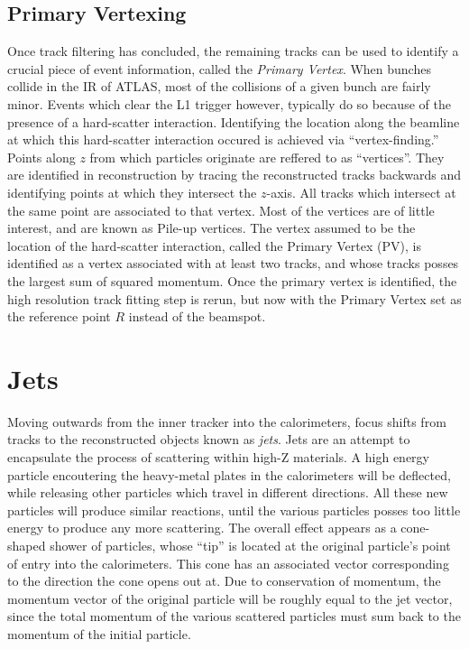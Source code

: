         \subsection{Primary Vertexing}

            Once track filtering has concluded,
                the remaining tracks can be used to identify a crucial piece of event information, 
                called the \textit{Primary Vertex}.
            When bunches collide in the IR of ATLAS, most of the collisions of a given bunch are fairly minor.
            Events which clear the L1 trigger however, typically do so because of the presence of a hard-scatter interaction. %
            Identifying the location along the beamline at which this hard-scatter interaction occured is achieved via ``vertex-finding.''
            Points along $z$ from which particles originate are reffered to as ``vertices''.
            They are identified in reconstruction by tracing the reconstructed tracks backwards
                and identifying points at which they intersect the $z$-axis.
            All tracks which intersect at the same point are associated to that vertex.
            Most of the vertices are of little interest, and are known as Pile-up vertices.
            The vertex assumed to be the location of the hard-scatter interaction, called the Primary Vertex (PV),
                is identified as a vertex associated with at least two tracks,
                and whose tracks posses the largest sum of squared momentum\cite{jet_energy_scale13TeV}.
            Once the primary vertex is identified, the high resolution track fitting step is rerun,
                but now with the Primary Vertex set as the reference point $R$ instead of the beamspot.


    \section{Jets}
        Moving outwards from the inner tracker into the calorimeters, focus shifts from tracks to the reconstructed objects known as \textit{jets}.
        Jets are an attempt to encapsulate the process of scattering within high-Z materials.
        A high energy particle encoutering the heavy-metal plates in the calorimeters will be deflected,
            while releasing other particles which travel in different directions.
        All these new particles will produce similar reactions, until the various particles posses too little energy to produce any more scattering.
        The overall effect appears as a cone-shaped shower of particles,
            whose ``tip'' is located at the original particle's point of entry into the calorimeters.
        This cone has an associated vector corresponding to the direction the cone opens out at.
        Due to conservation of momentum, the momentum vector of the original particle will be roughly equal to the jet vector,
            since the total momentum of the various scattered particles must sum back to the momentum of the initial particle.

